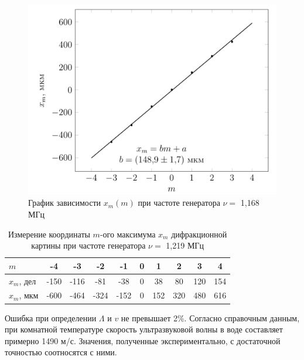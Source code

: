 \documentclass[journal, a4paper]{IEEEtran}
\begin{document}
	\begin{figure}[h!]
	\centering
	\includegraphics[width=1.02\linewidth]{1.png}
	\caption{График зависимости $  x_m(m) $ при частоте генератора $ \nu = $ 1,168 МГц}
	\label{nu1_graf}
\end{figure}
	
		\begin{table}[h!]
		\centering
		\begin{tabular}{|p{12pt}|c|c|c|c|c|c|c|c|c|}
\hline
$m$&-4&-3&-2&-1&0&1&2&3&4\\
\hline
$x_m$, дел&-150&-116&-81&-38&0&38&80&120&154\\
\hline
$x_m$, мкм&-600&-464&-324&-152&0&152&320&480&616\\
\hline
\end{tabular}

		\caption{Измерение координаты $ m $-ого максимума $ x_m $ дифракционной картины при частоте генератора $ \nu = $ 1,219 МГц}
		\label{nu2}
	\end{table}	
	Ошибка при определении $ \Lambda $ и $ v $ не превышает 2\%. Согласно справочным данным, при комнатной температуре скорость ультразвуковой волны в воде составляет примерно 1490 м/с. Значения, полученные экспериментально, с достаточной точностью соотносятся с ними.
\end{document}
